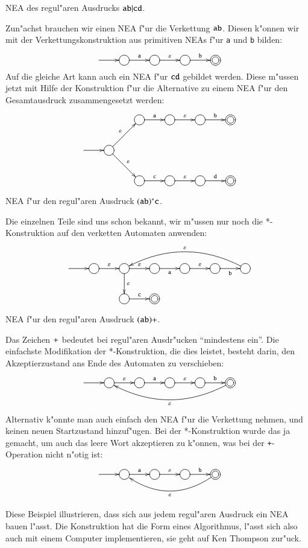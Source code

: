 \begin{beispiel}[\bf Beispiel 1] NEA des regul"aren Ausdrucks
${\tt ab}|{\tt cd}$.

Zun"achst brauchen wir einen NEA f"ur die Verkettung ${\tt ab}$.
Diesen k"onnen wir mit der Verkettungskonstruktion aus primitiven
NEAs f"ur {\tt a} und {\tt b} bilden:
\[
\entrymodifiers={++[o][F]}
\xymatrix{
*+\txt{}\ar[r]
	&{}\ar[r]^{\tt a}
		&{}\ar[r]^{\varepsilon}
			&{}\ar[r]^{\tt b}
				&*++[o][F=]{}
}
\]
Auf die gleiche Art kann auch ein NEA f"ur ${\tt cd}$ gebildet werden.
Diese m"ussen jetzt mit Hilfe der Konstruktion f"ur die Alternative
zu einem NEA f"ur den Gesamtausdruck zusammengesetzt werden:
\[
\entrymodifiers={++[o][F]}
\xymatrix{
*+\txt{}
	&*+\txt{}
		&{}\ar[r]^{\tt a}
			&{}\ar[r]^{\varepsilon}
				&{}\ar[r]^{\tt b}
					&*++[o][F=]{}
\\
*+\txt{} \ar[r]
	&{}\ar[ur]^{\varepsilon} \ar[dr]^{\varepsilon}
\\
*+\txt{}
	&*+\txt{}
		&{}\ar[r]^{\tt c}
			&{}\ar[r]^{\varepsilon}
				&{}\ar[r]^{\tt d}
					&*++[o][F=]{}
}
\]
\end{beispiel}

\begin{beispiel}[\bf Beispiel 2] NEA f"ur den regul"aren Ausdruck
$({\tt ab})^*{\tt c}$. 

Die einzelnen Teile sind uns schon bekannt, wir m"ussen nur noch
die *-Konstruktion auf den verketten Automaten anwenden:
\[
\entrymodifiers={++[o][F]}
\xymatrix{
*+\txt{}\ar[r]
	&{}\ar[r]^{\varepsilon}
		&{}\ar[r]^{\varepsilon}
			\ar[d]^{\varepsilon}
			&\ar[r]_{\tt a}
				&{}\ar[r]^{\varepsilon}
					&{}\ar[r]_{\tt b}
						&{}\ar@/_20pt/[llll]_{\varepsilon}
\\
*+\txt{}
	&*+\txt{}
		&{}\ar[r]^{\tt c}
			&*++[o][F=]{}
}
\]
\end{beispiel}

\begin{beispiel}[\bf Beispiel 3:] NEA f"ur den regul"aren Ausdruck
$({\tt ab})+$.

Das Zeichen ${\tt+}$ bedeutet bei regul"aren Ausdr"ucken ``mindestens ein''.
Die einfachste Modifikation der *-Konstruktion, die dies leistet, besteht
darin, den Akzeptierzustand ans Ende des Automaten zu verschieben:
\[
\entrymodifiers={++[o][F]}
\xymatrix{
*+\txt{}\ar[r]
	&{}\ar[r]^{\varepsilon}
		&{}\ar[r]^{\tt a}
			&{}\ar[r]^{\varepsilon}
				&{}\ar[r]^{\tt b}
					&*++[o][F=]{}\ar@/^20pt/[llll]^{\varepsilon}
}
\]
Alternativ k"onnte man auch einfach den NEA f"ur die Verkettung
nehmen, und keinen neuen Startzustand hinzuf"ugen. Bei der
*-Konstruktion wurde das ja gemacht, um auch das leere Wort
akzeptieren zu k"onnen, was bei der {\tt +}-Operation nicht
n"otig ist:
\[
\entrymodifiers={++[o][F]}
\xymatrix{
*+\txt{}\ar[r]
	&{}\ar[r]^{\tt a}
		&{}\ar[r]^{\varepsilon}
			&{}\ar[r]^{\tt b}
				&*++[o][F=]{}\ar@/^20pt/[lll]^{\varepsilon}
}
\]
\end{beispiel}
Diese Beispiel illustrieren, dass sich aus jedem regul"aren Ausdruck
ein NEA bauen l"asst. Die Konstruktion hat die Form eines Algorithmus,
l"asst sich also auch mit einem Computer implementieren, sie geht
auf Ken Thompson zur"uck.

